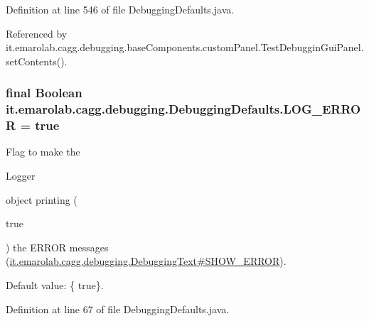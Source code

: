 Definition at line 546 of file Debugging\-Defaults.\-java.



Referenced by it.\-emarolab.\-cagg.\-debugging.\-base\-Components.\-custom\-Panel.\-Test\-Debuggin\-Gui\-Panel.\-set\-Contents().

\hypertarget{classit_1_1emarolab_1_1cagg_1_1debugging_1_1DebuggingDefaults_acd5d57de60e84e4807ede35008bb3d6c}{
\subsubsection[{L\-O\-G\-\_\-\-E\-R\-R\-O\-R}]{\setlength{\rightskip}{0pt plus 5cm}final Boolean it.\-emarolab.\-cagg.\-debugging.\-Debugging\-Defaults.\-L\-O\-G\-\_\-\-E\-R\-R\-O\-R = true\hspace{0.3cm}{\ttfamily [static]}}}\label{classit_1_1emarolab_1_1cagg_1_1debugging_1_1DebuggingDefaults_acd5d57de60e84e4807ede35008bb3d6c}
Flag to make the
\begin{DoxyCode}
Logger 
\end{DoxyCode}
 object printing (
\begin{DoxyCode}
\textcolor{keyword}{true} 
\end{DoxyCode}
 ) the E\-R\-R\-O\-R messages (\hyperlink{}{it.\-emarolab.\-cagg.\-debugging.\-Debugging\-Text\#\-S\-H\-O\-W\-\_\-\-E\-R\-R\-O\-R}).\par
 Default value\-: \{ true\}. 

Definition at line 67 of file Debugging\-Defaults.\-java.

